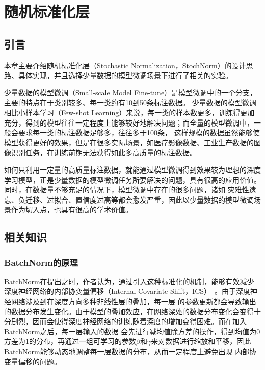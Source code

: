 \chapter{随机标准化层}

\section{引言}
本章主要介绍随机标准化层（Stochastic Normalization，StochNorm）的设计思路、具体实现，并且选择少量数据的模型微调场景下进行了相关的实验。

少量数据的模型微调（Small-scale Model Fine-tune）是模型微调中的一个分支，主要的特点在于类别较多、每一类约有10到50条标注数据。
少量数据的模型微调相比小样本学习（Few-shot Learning）来说，每一类的样本数更多，训练得更加充分，得到的模型往往一定程度上能够较好地解决问题；而全量的模型微调中，一般会要求每一类的标注数据足够多，往往多于100条，
这样规模的数据虽然能够使模型获得更好的效果，但是在很多实际场景，如医疗影像数据、工业生产数据的图像识别任务，在训练前期无法获得如此多高质量的标注数据。

如何只利用一定量的高质量标注数据，就能通过模型微调得到效果较为理想的深度学习模型，正是少量数据的模型微调任务所要解决的问题，具有很高的应用价值。同时，在数据量不够充足的情况下，模型微调中存在的很多问题，诸如
灾难性遗忘、负迁移、过拟合、置信度过高等都会愈发严重，因此以少量数据的模型微调场景作为切入点，也具有很高的学术价值。


\section{相关知识}

\subsection{BatchNorm的原理}

BatchNorm在提出之时，作者认为，通过引入这种标准化的机制，能够有效减少深度神经网络的内部协变量偏移（Internal Covariate Shift，ICS）~\citep{ioffe2015BN}。由于深度神经网络涉及到在深度方向多种非线性层的叠加，每一层
的参数更新都会导致输出的数据分布发生变化。由于模型的叠加效应，在网络深处的数据分布变化会变得十分剧烈，因而会使得深度神经网络的训练随着深度的增加变得困难。而在加入BatchNorm之后，每一层输入的数据
会先进行减均值除方差的操作，得到均值为$0$方差为$1$的分布，再通过一组可学习的参数$\beta$和$\gamma$来对数据进行缩放和平移，因此BatchNorm能够动态地调整每一层数据的分布，从而一定程度上避免出现
内部协变量偏移的问题。

